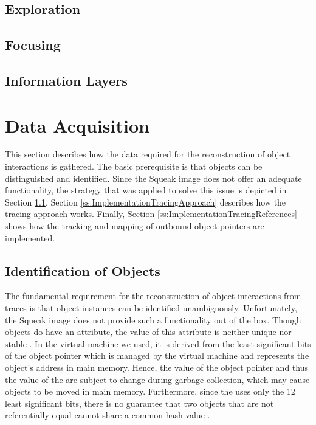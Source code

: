 \subsection{Exploration}
\subsection{Focusing}
\subsection{Information Layers}

\section{Data Acquisition}
\label{s:ImplementationTracing}
This section describes how the data required for the reconstruction of object interactions is gathered.
The basic prerequisite is that objects can be distinguished and identified.
Since the Squeak image does not offer an adequate functionality, the strategy that was applied to solve this issue is depicted in Section \ref{ss:ImplementationTracingIdentification}.
Section \ref{ss:ImplementationTracingApproach} describes how the tracing approach works.
Finally, Section \ref{ss:ImplementationTracingReferences} shows how the tracking and mapping of outbound object pointers are implemented.

\subsection{Identification of Objects}
\label{ss:ImplementationTracingIdentification}
The fundamental requirement for the reconstruction of object interactions from traces is that object instances can be identified unambiguously.
Unfortunately, the Squeak image does not provide such a functionality out of the box.
Though objects do have an  attribute, the value of this attribute is neither unique nor stable \cite{goldberg_smalltalk-80:_1983}.
In the virtual machine we used, it is derived from the least significant bits of the object pointer which is managed by the virtual machine and represents the object's address in main memory.
Hence, the value of the object pointer and thus the value of the  are subject to change during garbage collection, which may cause objects to be moved in main memory.
Furthermore, since the  uses only the 12 least significant bits, there is no guarantee that two objects that are not referentially equal cannot share a common hash value \cite{goldberg_smalltalk-80:_1983}.

